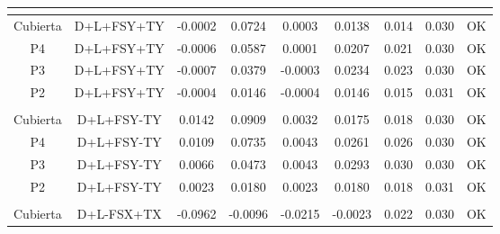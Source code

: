 \begin{table}[H]
{\begin{tabular}{|c|c|c|c|c|c|c|c|c|}
    \hline
    \multicolumn{1}{|r}{} & \multicolumn{1}{r}{} & \multicolumn{1}{r}{} & \multicolumn{1}{r}{} & \multicolumn{1}{r}{} & \multicolumn{1}{r}{} & \multicolumn{1}{r}{} & \multicolumn{1}{r}{} &  \bigstrut\\
    \hline
    Cubierta & D+L+FSY+TY & -0.0002 & 0.0724 & 0.0003 & 0.0138 & 0.014 & 0.030 & \cellcolor[rgb]{ .776,  .937,  .808}\textcolor[rgb]{ 0,  .38,  0}{OK} \bigstrut\\
    \hline
    P4  & D+L+FSY+TY & -0.0006 & 0.0587 & 0.0001 & 0.0207 & 0.021 & 0.030 & \cellcolor[rgb]{ .776,  .937,  .808}\textcolor[rgb]{ 0,  .38,  0}{OK} \bigstrut\\
    \hline
    P3  & D+L+FSY+TY & -0.0007 & 0.0379 & -0.0003 & 0.0234 & 0.023 & 0.030 & \cellcolor[rgb]{ .776,  .937,  .808}\textcolor[rgb]{ 0,  .38,  0}{OK} \bigstrut\\
    \hline
    P2  & D+L+FSY+TY & -0.0004 & 0.0146 & -0.0004 & 0.0146 & 0.015 & 0.031 & \cellcolor[rgb]{ .776,  .937,  .808}\textcolor[rgb]{ 0,  .38,  0}{OK} \bigstrut\\
    \hline
    \multicolumn{1}{|r}{} & \multicolumn{1}{r}{} & \multicolumn{1}{r}{} & \multicolumn{1}{r}{} & \multicolumn{1}{r}{} & \multicolumn{1}{r}{} & \multicolumn{1}{r}{} & \multicolumn{1}{r}{} &  \bigstrut\\
    \hline
    Cubierta & D+L+FSY-TY & 0.0142 & 0.0909 & 0.0032 & 0.0175 & 0.018 & 0.030 & \cellcolor[rgb]{ .776,  .937,  .808}\textcolor[rgb]{ 0,  .38,  0}{OK} \bigstrut\\
    \hline
    P4  & D+L+FSY-TY & 0.0109 & 0.0735 & 0.0043 & 0.0261 & 0.026 & 0.030 & \cellcolor[rgb]{ .776,  .937,  .808}\textcolor[rgb]{ 0,  .38,  0}{OK} \bigstrut\\
    \hline
    P3  & D+L+FSY-TY & 0.0066 & 0.0473 & 0.0043 & 0.0293 & 0.030 & 0.030 & \cellcolor[rgb]{ .776,  .937,  .808}\textcolor[rgb]{ 0,  .38,  0}{OK} \bigstrut\\
    \hline
    P2  & D+L+FSY-TY & 0.0023 & 0.0180 & 0.0023 & 0.0180 & 0.018 & 0.031 & \cellcolor[rgb]{ .776,  .937,  .808}\textcolor[rgb]{ 0,  .38,  0}{OK} \bigstrut\\
    \hline
    \multicolumn{1}{|r}{} & \multicolumn{1}{r}{} & \multicolumn{1}{r}{} & \multicolumn{1}{r}{} & \multicolumn{1}{r}{} & \multicolumn{1}{r}{} & \multicolumn{1}{r}{} & \multicolumn{1}{r}{} &  \bigstrut\\
    \hline
    Cubierta & D+L-FSX+TX & -0.0962 & -0.0096 & -0.0215 & -0.0023 & 0.022 & 0.030 & \cellcolor[rgb]{ .776,  .937,  .808}\textcolor[rgb]{ 0,  .38,  0}{OK} \bigstrut\\

\end{tabular}}
\end{table}

